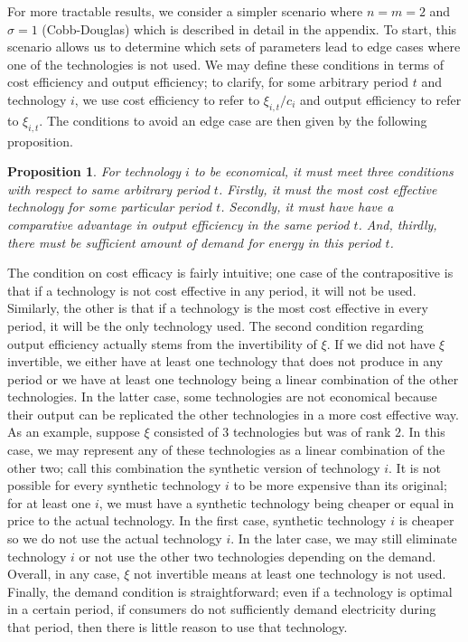 \documentclass[11pt,a4paper]{extarticle}
\newtheorem{proposition}{Proposition}
\begin{document}
For more tractable results, we consider a simpler scenario where $n = m = 2$ and $\sigma = 1$ (Cobb-Douglas) which is described in detail in the appendix. To start, this scenario allows us to determine which sets of parameters lead to edge cases where one of the technologies is not used. We may define these conditions in terms of cost efficiency and output efficiency; to clarify, for some arbitrary period $t$ and technology $i$, we use cost efficiency to refer to $\xi_{i,t}/c_i$ and output efficiency to refer to $\xi_{i,t}$. The conditions to avoid an edge case are then given by the following proposition.
\begin{proposition}
	For technology $i$ to be economical, it must meet three conditions with respect to same arbitrary period $t$. Firstly, it must the most cost effective technology for some particular period $t$. Secondly, it must have have a comparative advantage in output efficiency in the same period $t$. And, thirdly, there must be sufficient amount of demand for energy in this period $t$. 
\end{proposition}
The condition on cost efficacy is fairly intuitive; one case of the contrapositive is that if a technology is not cost effective in any period, it will not be used. Similarly, the other is that if a technology is the most cost effective in every period, it will be the only technology used. The second condition regarding output efficiency actually stems from the invertibility of $\xi$. If we did not have $\xi$ invertible, we either have at least one technology that does not produce in any period or we have at least one technology being a linear combination of the other technologies. In the latter case, some technologies are not economical because their output can be replicated the other technologies in a more cost effective way. As an example, suppose $\xi$ consisted of 3 technologies but was of rank $2$. In this case, we may represent any of these technologies as a linear combination of the other two; call this combination the synthetic version of technology $i$. It is not possible for every synthetic technology $i$ to be more expensive than its original; for at least one $i$, we must have a synthetic technology being cheaper or equal in price to the actual technology. In the first case, synthetic technology $i$ is cheaper so we do not use the actual technology $i$. In the later case, we may still eliminate technology $i$ or not use the other two technologies depending on the demand. Overall, in any case, $\xi$ not invertible means at least one technology is not used. Finally, the demand condition is straightforward; even if a technology is optimal in a certain period, if consumers do not sufficiently demand electricity during that period, then there is little reason to use that technology. 
\end{document}
